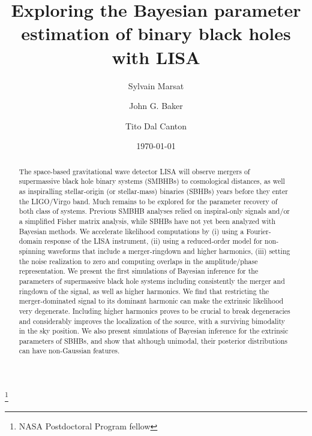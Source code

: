 \documentclass[aps,showpacs,twocolumn,prd,superscriptaddress,nofootinbib]{revtex4-1}
\begin{document}
\title{Exploring the Bayesian parameter estimation of binary black holes with LISA}

\author{Sylvain Marsat}
\author{John G. Baker}
\author{Tito Dal Canton}
\thanks{NASA Postdoctoral Program fellow}


\date{\today}

\begin{abstract}

The space-based gravitational wave detector LISA will observe mergers of supermassive black hole binary systems (SMBHBs) to cosmological distances, as well as inspiralling stellar-origin (or stellar-mass) binaries (SBHBs) years before they enter the LIGO/Virgo band. Much remains to be explored for the parameter recovery of both class of systems. Previous SMBHB analyses relied on inspiral-only signals and/or a simplified Fisher matrix analysis, while SBHBs have not yet been analyzed with Bayesian methods. We accelerate likelihood computations by (i) using a Fourier-domain response of the LISA instrument, (ii) using a reduced-order model for non-spinning waveforms that include a merger-ringdown and higher harmonics, (iii) setting the noise realization to zero and computing overlaps in the amplitude/phase representation. We present the first simulations of Bayesian inference for the parameters of supermassive black hole systems including consistently the merger and ringdown of the signal, as well as higher harmonics. We find that restricting the merger-dominated signal to its dominant harmonic can make the extrinsic likelihood very degenerate. Including higher harmonics proves to be crucial to break degeneracies and considerably improves the localization of the source, with a surviving bimodality in the sky position. We also present simulations of Bayesian inference for the extrinsic parameters of SBHBs, and show that although unimodal, their posterior distributions can have non-Gaussian features.

\end{abstract}
\end{document}

